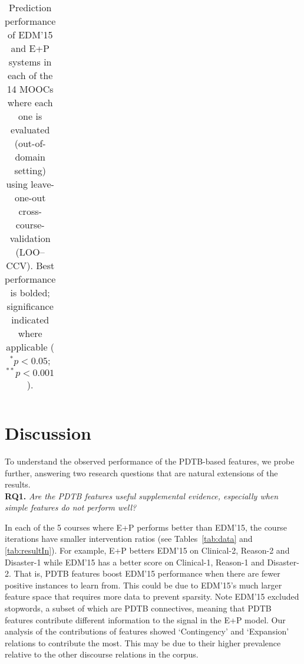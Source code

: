 \documentclass[letterpaper]{article}
\begin{document}
\begin{table}
\begin{tabular}{|l|r|r|r||r|r|r|}
\hline
\end{tabular}
\caption{Prediction performance of EDM'15 and E+P systems in each of
  the 14 MOOCs where each one is evaluated (out-of-domain setting)
  using leave-one-out cross-course-validation (LOO--CCV). Best
  performance is bolded; significance indicated where applicable
  ($^* p < 0.05$; $^{**}p < 0.001$).}
\label{tab:resultOut}
\end{table}

\section{Discussion}
\label{sect:discuss}

To understand the observed performance of the PDTB-based features, we
probe further, answering two research questions that are natural
extensions of the results.\\

\noindent \textbf{RQ1.} {\it Are the PDTB features useful supplemental evidence, 
especially when simple features do not perform well?}

In each of the 5 courses where E+P performs better than EDM'15, the course 
iterations have smaller intervention ratios (see Tables~\ref{tab:data} and 
\ref{tab:resultIn}). For example, E+P betters EDM'15 on {\sc Clinical-2}, {\sc 
Reason-2} and {\sc Disaster-1} while EDM'15 has a better score on {\sc Clinical-1}, 
{\sc Reason-1} and {\sc Disaster-2}.
That is, PDTB features boost EDM'15 performance when there 
are fewer positive instances to learn from. This could be due to EDM'15's 
much larger feature space that requires more data to prevent sparsity. Note 
EDM'15 excluded stopwords, a subset of which are PDTB connectives, meaning 
that PDTB features contribute different information to the signal in the E+P 
model.  Our analysis of the contributions of features showed `Contingency' and 
`Expansion' relations to contribute the most. This may be due to their higher 
prevalence relative to the other discourse relations in the corpus.
\end{document}
